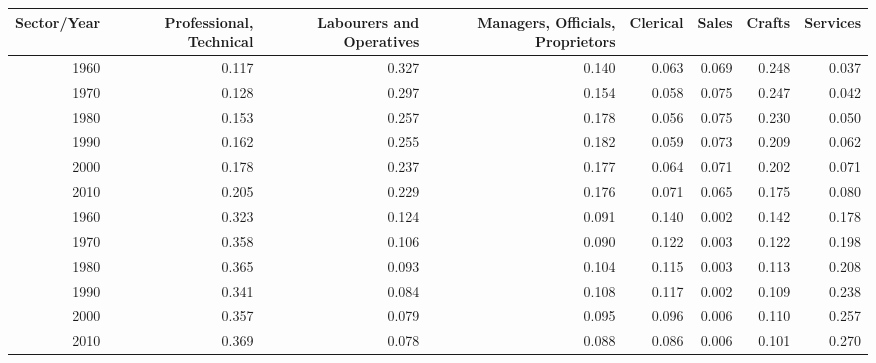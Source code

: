 \begin{tabular}{rrrrrrrr}
  \hline
Sector/Year & Professional, Technical & Labourers and Operatives & Managers, Officials, Proprietors & Clerical & Sales & Crafts & Services \\ 
  \hline
1960 & 0.117 & 0.327 & 0.140 & 0.063 & 0.069 & 0.248 & 0.037 \\ 
  1970 & 0.128 & 0.297 & 0.154 & 0.058 & 0.075 & 0.247 & 0.042 \\ 
  1980 & 0.153 & 0.257 & 0.178 & 0.056 & 0.075 & 0.230 & 0.050 \\ 
  1990 & 0.162 & 0.255 & 0.182 & 0.059 & 0.073 & 0.209 & 0.062 \\ 
  2000 & 0.178 & 0.237 & 0.177 & 0.064 & 0.071 & 0.202 & 0.071 \\ 
  2010 & 0.205 & 0.229 & 0.176 & 0.071 & 0.065 & 0.175 & 0.080 \\ 
  1960 & 0.323 & 0.124 & 0.091 & 0.140 & 0.002 & 0.142 & 0.178 \\ 
  1970 & 0.358 & 0.106 & 0.090 & 0.122 & 0.003 & 0.122 & 0.198 \\ 
  1980 & 0.365 & 0.093 & 0.104 & 0.115 & 0.003 & 0.113 & 0.208 \\ 
  1990 & 0.341 & 0.084 & 0.108 & 0.117 & 0.002 & 0.109 & 0.238 \\ 
  2000 & 0.357 & 0.079 & 0.095 & 0.096 & 0.006 & 0.110 & 0.257 \\ 
  2010 & 0.369 & 0.078 & 0.088 & 0.086 & 0.006 & 0.101 & 0.270 \\ 
   \hline
\end{tabular}
